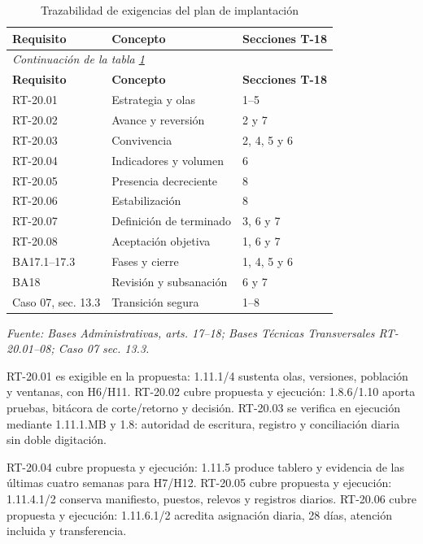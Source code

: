 \begingroup\small\setlength{\tabcolsep}{3pt}
\begin{longtable}{p{}p{}p{}}
\caption{Trazabilidad de exigencias del plan de implantación}\label{tab:t18-trazabilidad}\\\hline
\textbf{Requisito} & \textbf{Concepto} & \textbf{Secciones T-18}\\\hline\endfirsthead
\multicolumn{3}{l}{\textit{Continuación de la tabla \ref{tab:t18-trazabilidad}}}\\\hline
\textbf{Requisito} & \textbf{Concepto} & \textbf{Secciones T-18}\\\hline\endhead
\hline\endfoot\hline\endlastfoot
RT-20.01 & Estrategia y olas & 1--5\\\hline
RT-20.02 & Avance y reversión & 2 y 7\\\hline
RT-20.03 & Convivencia & 2, 4, 5 y 6\\\hline
RT-20.04 & Indicadores y volumen & 6\\\hline
RT-20.05 & Presencia decreciente & 8\\\hline
RT-20.06 & Estabilización & 8\\\hline
RT-20.07 & Definición de terminado & 3, 6 y 7\\\hline
RT-20.08 & Aceptación objetiva & 1, 6 y 7\\\hline
BA17.1--17.3 & Fases y cierre & 1, 4, 5 y 6\\\hline
BA18 & Revisión y subsanación & 6 y 7\\\hline
Caso 07, sec. 13.3 & Transición segura & 1--8\\\hline
\end{longtable}\endgroup
\noindent\textit{Fuente: Bases Administrativas, arts. 17--18; Bases Técnicas Transversales RT-20.01--08; Caso 07 sec. 13.3.}

RT-20.01 es exigible en la propuesta: 1.11.1/4 sustenta olas, versiones, población y ventanas, con H6/H11. RT-20.02 cubre propuesta y ejecución: 1.8.6/1.10 aporta pruebas, bitácora de corte/retorno y decisión. RT-20.03 se verifica en ejecución mediante 1.11.1.MB y 1.8: autoridad de escritura, registro y conciliación diaria sin doble digitación.

RT-20.04 cubre propuesta y ejecución: 1.11.5 produce tablero y evidencia de las últimas cuatro semanas para H7/H12. RT-20.05 cubre propuesta y ejecución: 1.11.4.1/2 conserva manifiesto, puestos, relevos y registros diarios. RT-20.06 cubre propuesta y ejecución: 1.11.6.1/2 acredita asignación diaria, 28 días, atención incluida y transferencia.

